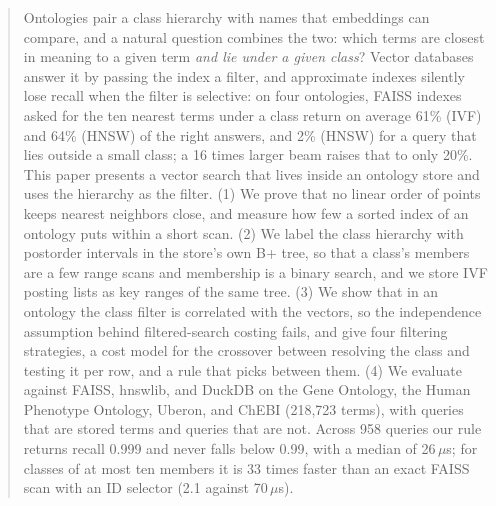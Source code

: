 \begin{abstract}
Ontologies pair a class hierarchy with names that embeddings can compare, and a
natural question combines the two: which terms are closest in meaning to a given
term \emph{and lie under a given class}?
Vector databases answer it by passing the index a filter, and approximate indexes
silently lose recall when the filter is selective: on four ontologies, FAISS
indexes asked for the ten nearest terms under a class return on average 61\% (IVF)
and 64\% (HNSW) of the right answers, and 2\% (HNSW) for a query that lies outside a
small class; a 16 times larger beam raises that to only 20\%.
This paper presents a vector search that lives inside an ontology store and uses
the hierarchy as the filter.
(1) We prove that no linear order of points keeps nearest neighbors close, and
measure how few a sorted index of an ontology puts within a short scan.
(2) We label the class hierarchy with postorder intervals in the store's own
B+ tree, so that a class's members are a few range scans and membership is a
binary search, and we store IVF posting lists as key ranges of the same tree.
(3) We show that in an ontology the class filter is correlated with the vectors, so
the independence assumption behind filtered-search costing fails, and give
four filtering strategies, a cost model for the crossover between resolving the
class and testing it per row, and a rule that picks between them.
(4) We evaluate against FAISS, hnswlib, and DuckDB on the Gene Ontology, the Human
Phenotype Ontology, Uberon, and ChEBI (218,723 terms), with queries that are
stored terms and queries that are not.
Across 958 queries our rule returns recall 0.999 and never falls below 0.99, with a
median of 26\,$\mu$s; for classes of at most ten members it is 33 times faster than
an exact FAISS scan with an ID selector (2.1 against 70\,$\mu$s).
\end{abstract}

